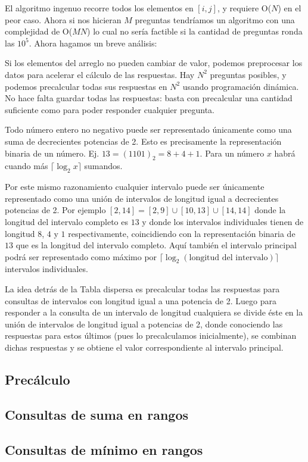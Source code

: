 El algoritmo ingenuo recorre todos los elementos en $[i, j]$, y requiere O($N$) en el peor caso. Ahora si nos hicieran $M$ preguntas tendríamos un algoritmo con una complejidad de O($MN$) lo cual no sería factible si la cantidad de preguntas ronda las $10^5$. Ahora hagamos un breve análisis:

Si los elementos del arreglo no pueden cambiar de valor, podemos preprocesar los datos para acelerar el cálculo de las respuestas. Hay $N^2$ preguntas posibles, y podemos precalcular todas sus respuestas en  $N^2$  usando programación dinámica. No hace falta guardar todas las respuestas: basta con
precalcular una cantidad suficiente como para poder responder cualquier pregunta.

Todo número entero no negativo puede ser representado únicamente como una suma de decrecientes potencias de 2. Esto es precisamente la representación binaria de un número. Ej. $13 = (1101)_2 = 8 + 4 + 1$. Para un número $x$ habrá cuando más $\lceil \log_2 x \rceil$ sumandos.

Por este mismo razonamiento cualquier intervalo puede ser únicamente representado como una unión de intervalos de longitud igual a decrecientes potencias de 2. Por ejemplo $[2, 14] = [2, 9] \cup [10, 13] \cup [14, 14]$ donde la longitud del intervalo completo es $13$ y donde los intervalos individuales tienen de longitud $8$, $4$ y $1$ respectivamente, coincidiendo con la representación binaria de $13$ que es la longitud del intervalo completo. Aquí también el intervalo principal podrá ser representado como máximo por  $\lceil \log_2(\text{longitud del intervalo}) \rceil$ intervalos individuales.

La idea detrás de la Tabla dispersa es precalcular todas las respuestas para consultas de intervalos con longitud igual a una potencia de 2. Luego para responder a la consulta de un intervalo de longitud cualquiera se divide éste en la unión de intervalos de longitud igual a potencias de 2, donde conociendo las respuestas para estos últimos (pues lo precalculamos inicialmente), se combinan dichas respuestas y se obtiene el valor correspondiente al intervalo principal.

\subsection{Precálculo}


\subsection{Consultas de suma en rangos}


\subsection{Consultas de mínimo en rangos}
